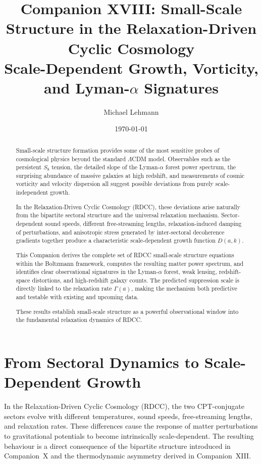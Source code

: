 \documentclass[11pt,a4paper]{article}
\title{\textbf{Companion XVIII: Small-Scale Structure in the Relaxation-Driven Cyclic Cosmology}\\
\textbf{Scale-Dependent Growth, Vorticity, and Lyman-$\alpha$ Signatures}}
\author[1]{Michael Lehmann}
\affil[1]{\small Independent Researcher, Relaxation-Driven Cyclic Cosmology (RDCC) Framework\\
\texttt{mi.lehmann@gmx.de}}
\date{\small \today}
\begin{document}
\maketitle

\begin{abstract}
Small-scale structure formation provides some of the most sensitive probes of cosmological
physics beyond the standard $\Lambda$CDM model. Observables such as the persistent $S_8$
tension, the detailed slope of the Lyman-$\alpha$ forest power spectrum, the surprising
abundance of massive galaxies at high redshift, and measurements of cosmic vorticity and
velocity dispersion all suggest possible deviations from purely scale-independent growth.

In the Relaxation-Driven Cyclic Cosmology (RDCC), these deviations arise naturally from the
bipartite sectoral structure and the universal relaxation mechanism. Sector-dependent sound
speeds, different free-streaming lengths, relaxation-induced damping of perturbations, and
anisotropic stress generated by inter-sectoral decoherence gradients together produce a
characteristic scale-dependent growth function $D(a,k)$.

This Companion derives the complete set of RDCC small-scale structure equations within the
Boltzmann framework, computes the resulting matter power spectrum, and identifies clear
observational signatures in the Lyman-$\alpha$ forest, weak lensing, redshift-space distortions,
and high-redshift galaxy counts. The predicted suppression scale is directly linked to the
relaxation rate $\Gamma(a)$, making the mechanism both predictive and testable with existing
and upcoming data.

These results establish small-scale structure as a powerful observational window into the
fundamental relaxation dynamics of RDCC.
\end{abstract}
\section{From Sectoral Dynamics to Scale-Dependent Growth}

In the Relaxation-Driven Cyclic Cosmology (RDCC), the two CPT-conjugate sectors evolve
with different temperatures, sound speeds, free-streaming lengths, and relaxation rates.
These differences cause the response of matter perturbations to gravitational potentials to
become intrinsically scale-dependent. The resulting behaviour is a direct consequence of the
bipartite structure introduced in Companion~X and the thermodynamic asymmetry derived
in Companion~XIII.
\end{document}
